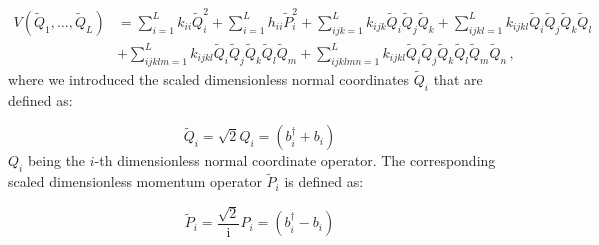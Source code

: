 \documentclass[bibliography=totoc,12pt,a4paper]{scrartcl}
\begin{document}
\begin{equation}
  \begin{aligned}
    V(\tilde{Q}_1, \ldots, \tilde{Q}_L) 
      &= \sum_{i=1}^L k_{ii} \tilde{Q}_i^2 + \sum_{i=1}^L h_{ii} \tilde{P}_i^2 
      + \sum_{ijk=1}^L k_{ijk} \tilde{Q}_i \tilde{Q}_j \tilde{Q}_k
      + \sum_{ijkl=1}^L k_{ijkl} \tilde{Q}_i \tilde{Q}_j \tilde{Q}_k \tilde{Q}_l \\
      &+ \sum_{ijklm=1}^L k_{ijkl} \tilde{Q}_i \tilde{Q}_j \tilde{Q}_k \tilde{Q}_l \tilde{Q}_m
      + \sum_{ijklmn=1}^L k_{ijkl} \tilde{Q}_i \tilde{Q}_j \tilde{Q}_k \tilde{Q}_l \tilde{Q}_m \tilde{Q}_n \, ,
  \end{aligned}
  \label{eq:PES_Representation}
\end{equation}
%
where we introduced the scaled dimensionless normal coordinates $\tilde{Q}_i$ that are defined as:

\begin{equation}
  \tilde{Q}_i = \sqrt{2} Q_i = \left( b_i^\dagger + b_i \right)
  \label{eq:ScaledNM}
\end{equation}
%
$Q_i$ being the $i$-th dimensionless normal coordinate operator.
The corresponding scaled dimensionless momentum operator $\tilde{P}_i$ is defined as:

\begin{equation}
  \tilde{P}_i = \frac{\sqrt{2}}{\mathrm{i}} P_i = \left( b_i^\dagger - b_i \right)
  \label{eq:ScaledNM_Momentum}
\end{equation}
\end{document}
